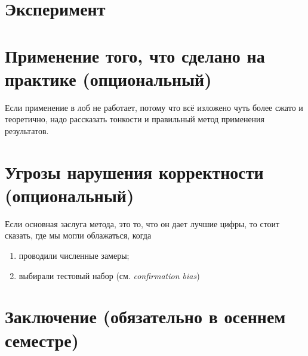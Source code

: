 \section{Эксперимент}


\section{Применение того, что сделано на практике (опциональный)}

Если применение в лоб не работает, потому что всё изложено чуть более сжато и теоретично, надо рассказать тонкости и правильный метод применения результатов. 

\section{Угрозы нарушения корректности (опциональный)}

Если основная заслуга метода, это то, что он дает лучшие цифры, то стоит сказать, где мы могли облажаться, когда
\begin{enumerate}
\item проводили численные замеры;
\item выбирали тестовый набор (см. \emph{confirmation bias})
\end{enumerate} 

\section{Заключение (обязательно в осеннем семестре)}



\setmonofont[Mapping=tex-text]{CMU Typewriter Text}
  
  

